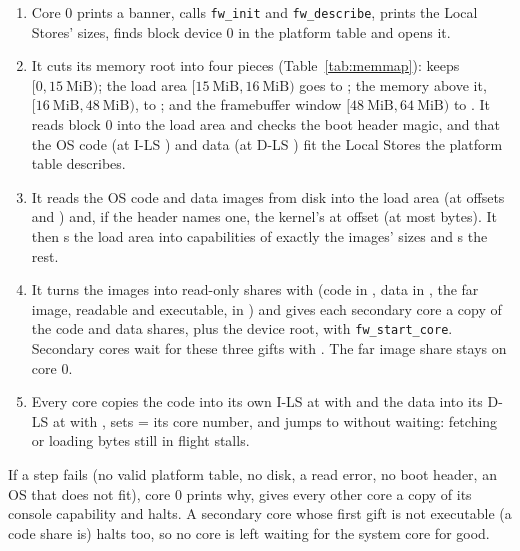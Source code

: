 \begin{enumerate}
\item Core 0 prints a banner, calls \texttt{fw\_init} and \texttt{fw\_describe}, prints the Local Stores'
  sizes, finds block device 0 in the platform table and opens it.
\item It cuts its memory root into four pieces (Table~\ref{tab:memmap}):  keeps
  $[0, 15~\text{MiB})$; the load area $[15~\text{MiB}, 16~\text{MiB})$ goes to ; the memory above
  it, $[16~\text{MiB}, 48~\text{MiB})$, to ; and the framebuffer window
  $[48~\text{MiB}, 64~\text{MiB})$ to . It reads block 0 into the load area and checks the boot
  header magic, and that the OS code (at I-LS ) and data (at D-LS ) fit the
  Local Stores the platform table describes.
\item It reads the OS code and data images from disk into the load area (at offsets  and
  ) and, if the header names one, the kernel's  at offset  (at
  most  bytes). It then s the load area into capabilities of exactly the images'
  sizes and s the rest.
\item It turns the images into read-only shares with  (code in , data in
  , the far image, readable and executable, in ) and gives each secondary core a copy
  of the code and data shares, plus the device root, with \texttt{fw\_start\_core}. Secondary cores wait
  for these three gifts with . The far image share stays on core 0.
\item Every core copies the code into its own I-LS at  with  and the data into its
  D-LS at  with , sets  = its core number, and jumps to  without
  waiting: fetching or loading bytes still in flight stalls.
\end{enumerate}

If a step fails (no valid platform table, no disk, a read error, no boot header, an OS that does not
fit), core 0 prints why, gives every other core a copy of its console capability  and halts.
A secondary core whose first gift is not executable (a code share is) halts too, so no core is left
waiting for the system core for good.

